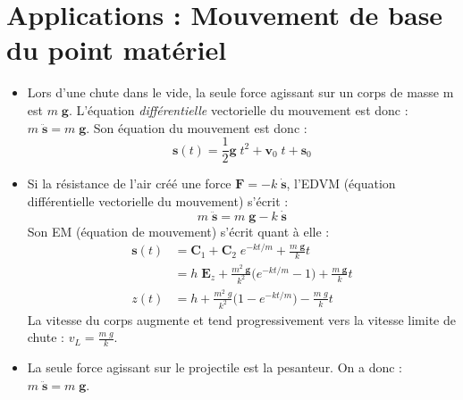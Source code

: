\documentclass[a4paper]{article}
\begin{document}
\section{Applications : Mouvement de base du point matériel}










\begin{itemize}





\item Lors d'une chute dans le vide, la seule force agissant sur un corps de masse m est $ m \; \textbf{g} $. L'équation \emph{différentielle} vectorielle du mouvement est donc : $ m \; \ddot{\textbf{s}} = m \; \textbf{g} $. Son équation du mouvement est donc : 
\[ \textbf{s}(t) = \frac{1}{2} \textbf{g} \; t^2 + \textbf{v}_0 \; t + \textbf{s}_0 \]





\item Si la résistance de l'air créé une force $ \textbf{F} = - k \; \dot{\textbf{s}} $, l'EDVM (équation différentielle vectorielle du mouvement) s'écrit : 
\[ m \; \ddot{\textbf{s}} = m \; \textbf{g} - k \; \dot{\textbf{s}} \]
Son EM (équation de mouvement) s'écrit quant à elle : 
\begin{align*}
\textbf{s}(t) &= \textbf{C}_1 + \textbf{C}_2 \; e^{- k t / m} + \frac{m \; \textbf{g}}{k} t \\
&= h \; \textbf{E}_z + \frac{m^2 \; \textbf{g}}{k^2} \Big( e^{- k t / m} - 1 \Big) + \frac{m \; \textbf{g}}{k} t \\
z(t) &= h + \frac{m^2 \; g}{k^2} \Big( 1 - e^{- k t / m} \Big) - \frac{m \; g}{k} t
\end{align*}
La vitesse du corps augmente et tend progressivement vers la vitesse limite de chute : $\displaystyle v_L = \frac{m \; g}{k} $.





\item La seule force agissant sur le projectile est la pesanteur. On a donc : $\displaystyle m \; \ddot{\textbf{s}} = m \; \textbf{g} $.

\begin{center}
\begin{tikzpicture}[every node/.style={draw,outer sep=0pt,thick}]


\end{tikzpicture}
\end{center}
\end{itemize}
\end{document}
